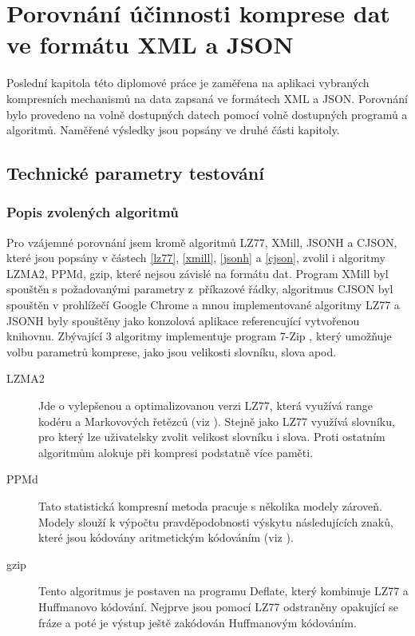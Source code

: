 \chapter{Porovnání účinnosti komprese dat ve formátu XML a JSON}
\label{kapitolaPorovnaniUcinnosti}
Poslední kapitola této diplomové práce je zaměřena na aplikaci vybraných kompresních mechanismů na data zapsaná ve formátech XML a JSON. Porovnání bylo provedeno na volně dostupných datech pomocí volně dostupných programů a algoritmů. Naměřené výsledky jsou popsány ve druhé části kapitoly.

\section{Technické parametry testování}

\subsection{Popis zvolených algoritmů}
Pro vzájemné porovnání jsem kromě algoritmů LZ77, XMill, JSONH a CJSON, které jsou popsány v částech \ref{lz77}, \ref{xmill}, \ref{jsonh} a \ref{cjson}, zvolil i algoritmy LZMA2, PPMd, gzip, které nejsou závislé na formátu dat. Program XMill byl spouštěn s požadovanými parametry z~příkazové řádky, algoritmus CJSON byl spouštěn v prohlížečí Google Chrome a mnou implementované algoritmy LZ77 a JSONH byly spouštěny jako konzolová aplikace referencující vytvořenou knihovnu. Zbývající 3 algoritmy implementuje program 7-Zip \cite{7zip}, který umožňuje volbu parametrů komprese, jako jsou velikosti slovníku, slova apod.

\begin{description}
\item[LZMA2] Jde o vylepšenou a optimalizovanou verzi LZ77, která využívá range kodéru a Markovových řetězců (viz \cite{introductionToDataCompression}). Stejně jako LZ77 využívá slovníku, pro který lze uživatelsky zvolit velikost slovníku i slova. Proti ostatním algoritmům alokuje při kompresi podstatně více paměti.
\item[PPMd] Tato statistická kompresní metoda pracuje s několika modely zároveň. Modely slouží k výpočtu pravděpodobnosti výskytu následujících znaků, které jsou kódovány aritmetickým kódováním (viz \cite{introductionToDataCompression}).
\item[gzip] Tento algoritmus je postaven na programu Deflate, který kombinuje LZ77 a Huffmanovo kódování. Nejprve jsou pomocí LZ77 odstraněny opakující se fráze a poté je výstup ještě zakódován Huffmanovým kódováním. 
\end{description}

